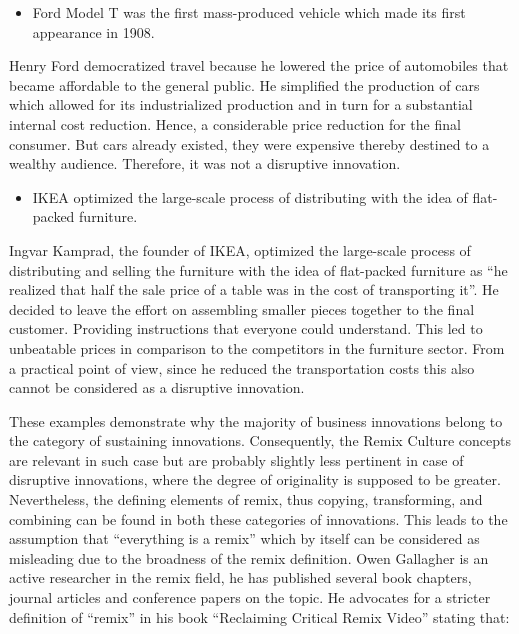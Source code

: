 \begin{itemize}
\item Ford Model T was the first mass-produced vehicle which made its first appearance in 1908. 
\end{itemize}

Henry Ford democratized travel because he lowered the price of automobiles that became affordable to the general public. He simplified the production of cars which allowed for its industrialized production and in turn for a substantial internal cost reduction. Hence, a considerable price reduction for the final consumer. But cars already existed, they were expensive thereby destined to a wealthy audience. Therefore, it was not a disruptive innovation.

\begin{itemize}
\item IKEA optimized the large-scale process of distributing with the idea of flat-packed furniture.
\end{itemize}

Ingvar Kamprad, the founder of IKEA, optimized the large-scale process of distributing and selling the furniture with the idea of flat-packed furniture as “he realized that half the sale price of a table was in the cost of transporting it”. He decided to leave the effort on assembling smaller pieces together to the final customer. Providing instructions that everyone could understand. This led to unbeatable prices in comparison to the competitors in the furniture sector. From a practical point of view, since he reduced the transportation costs this also cannot be considered as a disruptive innovation.

These examples demonstrate why the majority of business innovations belong to the category of sustaining innovations. Consequently, the Remix Culture concepts are relevant in such case but are probably slightly less pertinent in case of disruptive innovations, where the degree of originality is supposed to be greater. Nevertheless, the defining elements of remix, thus copying, transforming, and combining can be found in both these categories of innovations.
This leads to the assumption that “everything is a remix” which by itself can be considered as misleading due to the broadness of the remix definition. Owen Gallagher is an active researcher in the remix field, he has published several book chapters, journal articles and conference papers on the topic. He advocates for a stricter definition of “remix” in his book “Reclaiming Critical Remix Video” stating that:

